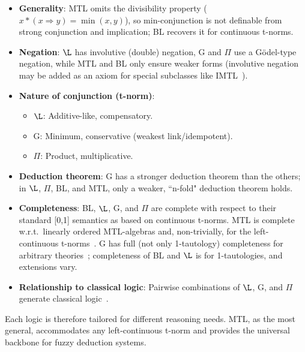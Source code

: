 \begin{itemize}
    \item \textbf{Generality}: MTL omits the divisibility property ($x*(x \Rightarrow y)=\min(x,y)$), so min-conjunction is not definable from strong conjunction and implication; BL recovers it for continuous t-norms.
    \item \textbf{Negation}: $\L$ has involutive (double) negation, G and $\Pi$ use a Gödel-type negation, while MTL and BL only ensure weaker forms (involutive negation may be added as an axiom for special subclasses like IMTL~\cite{GodoMonoidal}).
    \item \textbf{Nature of conjunction (t-norm)}:
        \begin{itemize}
            \item $\L$: Additive-like, compensatory.
            \item G: Minimum, conservative (weakest link/idempotent).
            \item $\Pi$: Product, multiplicative.
        \end{itemize}
    \item \textbf{Deduction theorem}: G has a stronger deduction theorem than the others; in $\L$, $\Pi$, BL, and MTL, only a weaker, ``n-fold" deduction theorem holds.
    \item \textbf{Completeness}: BL, $\L$, G, and $\Pi$ are complete with respect to their standard [0,1] semantics as based on continuous t-norms. MTL is complete w.r.t.\ linearly ordered MTL-algebras and, non-trivially, for the left-continuous t-norms~\cite{Jenei2001MTLCompl}. G has full (not only 1-tautology) completeness for arbitrary theories~\cite[Thm. 4.2.17]{Hajek1998}; completeness of BL and $\L$ is for 1-tautologies, and extensions vary.
    \item \textbf{Relationship to classical logic}: Pairwise combinations of $\L$, G, and $\Pi$ generate classical logic~\cite[Thm. 4.3.9]{Hajek1998}.
\end{itemize}
Each logic is therefore tailored for different reasoning needs. MTL, as the most general, accommodates any left-continuous t-norm and provides the universal backbone for fuzzy deduction systems.




